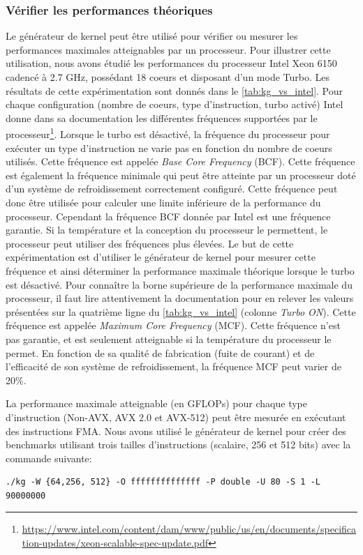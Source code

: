     \subsubsection{Vérifier les performances théoriques}
    Le générateur de kernel peut être utilisé pour vérifier ou mesurer les performances maximales atteignables par un processeur. Pour illustrer cette utilisation, nous avons étudié les performances du processeur Intel Xeon 6150 cadencé à 2.7 GHz, possédant 18 coeurs et disposant d'un mode Turbo. Les résultats de cette expérimentation sont donnés dans le \autoref{tab:kg_vs_intel}. Pour chaque configuration (nombre de coeurs, type d'instruction, turbo activé) Intel donne dans sa documentation les différentes fréquences supportées par le processeur\footnote{\url{https://www.intel.com/content/dam/www/public/us/en/documents/specification-updates/xeon-scalable-spec-update.pdf}}. Lorsque le turbo est désactivé, la fréquence du processeur pour exécuter un type d'instruction ne varie pas en fonction du nombre de coeurs utilisés. Cette fréquence est appelée \textit{Base Core Frequency} (BCF). Cette fréquence est également la fréquence minimale qui peut être atteinte par un processeur doté d'un système de refroidissement correctement configuré. Cette fréquence peut donc être utilisée pour calculer une limite inférieure de la performance du processeur. Cependant la fréquence BCF donnée par Intel est une fréquence garantie. Si la température et la conception du processeur le permettent, le processeur peut utiliser des fréquences plus élevées. Le but de cette expérimentation est d'utiliser le générateur de kernel pour mesurer cette fréquence et ainsi déterminer la performance maximale théorique lorsque le turbo est désactivé. 
    Pour connaître la borne supérieure de la performance maximale du processeur, il faut lire attentivement la documentation pour en relever les valeurs présentées sur la quatrième ligne du \autoref{tab:kg_vs_intel} (colonne \textit{Turbo ON}). Cette fréquence est appelée \textit{Maximum Core Frequency} (MCF). Cette fréquence n'est pas garantie, et est seulement atteignable si la température du processeur le permet. En fonction de sa qualité de fabrication (fuite de courant) et de l'efficacité de son système de refroidissement, la fréquence MCF peut varier de 20\%.  

    
    La performance maximale atteignable (en GFLOPs) pour chaque type d'instruction (Non-AVX, AVX 2.0 et AVX-512) peut être mesurée en exécutant des instructions FMA. Nous avons utilisé le générateur de kernel pour créer des benchmarks utilisant trois tailles d'instructions (scalaire, 256 et 512 bits) avec la commande suivante:
\begin{lstlisting}
./kg -W {64,256, 512} -O ffffffffffffff -P double -U 80 -S 1 -L 90000000
\end{lstlisting}


